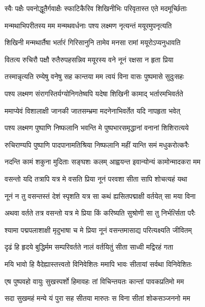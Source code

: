 \twolineshloka
{स्वैः पक्षैः पवनोद्धूतैर्गवाक्षैः स्फाटिकैरिव}
{शिखिनीभिः परिवृतास्त एते मदमूर्च्छिताः} %

\twolineshloka
{मन्मथाभिपरीतस्य मम मन्मथवर्धनाः}
{पश्य लक्ष्मण नृत्यन्तं मयूरमुपनृत्यति} %

\twolineshloka
{शिखिनी मन्मथार्तैषा भर्तारं गिरिसानुनि}
{तामेव मनसा रामां मयूरोऽप्यनुधावति} %

\twolineshloka
{वितत्य रुचिरौ पक्षौ रुतैरुपहसन्निव}
{मयूरस्य वने नूनं रक्षसा न हृता प्रिया} %

\twolineshloka
{तस्मान्नृत्यति रम्येषु वनेषु सह कान्तया}
{मम त्वयं विना वासः पुष्पमासे सुदुःसहः} %

\twolineshloka
{पश्य लक्ष्मण संरागस्तिर्यग्योनिगतेष्वपि}
{यदेषा शिखिनी कामाद् भर्तारमभिवर्तते} %

\twolineshloka
{ममाप्येवं विशालाक्षी जानकी जातसम्भ्रमा}
{मदनेनाभिवर्तेत यदि नापहृता भवेत्} %

\twolineshloka
{पश्य लक्ष्मण पुष्पाणि निष्फलानि भवन्ति मे}
{पुष्पभारसमृद्धानां वनानां शिशिरात्यये} %

\twolineshloka
{रुचिराण्यपि पुष्पाणि पादपानामतिश्रिया}
{निष्फलानि महीं यान्ति समं मधुकरोत्करैः} %

\twolineshloka
{नदन्ति कामं शकुना मुदिताः सङ्घशः कलम्}
{आह्वयन्त इवान्योन्यं कामोन्मादकरा मम} %

\twolineshloka
{वसन्तो यदि तत्रापि यत्र मे वसति प्रिया}
{नूनं परवशा सीता सापि शोचत्यहं यथा} %

\twolineshloka
{नूनं न तु वसन्तस्तं देशं स्पृशति यत्र सा}
{कथं ह्यसितपद्माक्षी वर्तयेत् सा मया विना} %

\twolineshloka
{अथवा वर्तते तत्र वसन्तो यत्र मे प्रिया}
{किं करिष्यति सुश्रोणी सा तु निर्भर्त्सिता परैः} %

\twolineshloka
{श्यामा पद्मपलाशाक्षी मृदुभाषा च मे प्रिया}
{नूनं वसन्तमासाद्य परित्यक्ष्यति जीवितम्} %

\twolineshloka
{दृढं हि हृदये बुद्धिर्मम सम्परिवर्तते}
{नालं वर्तयितुं सीता साध्वी मद्विरहं गता} %

\twolineshloka
{मयि भावो हि वैदेह्यास्तत्त्वतो विनिवेशितः}
{ममापि भावः सीतायां सर्वथा विनिवेशितः} %

\twolineshloka
{एष पुष्पवहो वायुः सुखस्पर्शो हिमावहः}
{तां विचिन्तयतः कान्तां पावकप्रतिमो मम} %

\twolineshloka
{सदा सुखमहं मन्ये यं पुरा सह सीतया}
{मारुतः स विना सीतां शोकसञ्जननो मम} %

